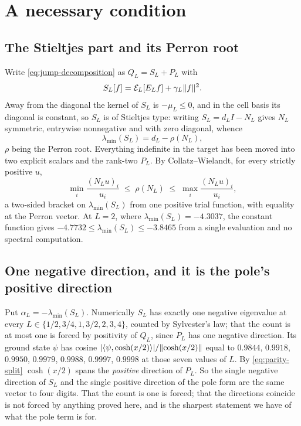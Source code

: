 \section{A necessary condition}\label{sec:necessary}
\subsection{The Stieltjes part and its Perron root}
Write \eqref{eq:jump-decomposition} as $Q_L=S_L+P_L$ with
\begin{equation}\label{eq:SL}
 S_L[f]=\mathcal E_L[E_Lf]+\gamma_L\lVert f\rVert^2 .
\end{equation}
Away from the diagonal the kernel of $S_L$ is $-\mu_L\leq0$, and in the cell
basis its diagonal is constant, so $S_L$ is of Stieltjes type: writing
$S_L=d_LI-N_L$ gives $N_L$ symmetric, entrywise nonnegative and with zero
diagonal, whence
\begin{equation}\label{eq:perron}
 \lambda_{\min}(S_L)=d_L-\rho(N_L),
\end{equation}
$\rho$ being the Perron root. Everything indefinite in the target has been moved
into two explicit scalars and the rank-two $P_L$. By Collatz--Wielandt, for
every strictly positive $u$,
\begin{equation}\label{eq:cw}
 \min_i\frac{(N_Lu)_i}{u_i}\;\leq\;\rho(N_L)\;\leq\;\max_i\frac{(N_Lu)_i}{u_i},
\end{equation}
a two-sided bracket on $\lambda_{\min}(S_L)$ from one positive trial function,
with equality at the Perron vector. At $L=2$, where
$\lambda_{\min}(S_L)=-4.3037$, the constant function gives
$-4.7732\leq\lambda_{\min}(S_L)\leq-3.8465$ from a single evaluation and no
spectral computation.

\subsection{One negative direction, and it is the pole's positive direction}
Put $\alpha_L=-\lambda_{\min}(S_L)$. Numerically $S_L$ has exactly one negative
eigenvalue at every $L\in\{1/2,3/4,1,3/2,2,3,4\}$, counted by Sylvester's law;
that the count is at most one is forced by positivity of $Q_L$, since
$P_L$ has one negative direction. Its ground state $\psi$ has cosine
$|\langle \psi,\cosh(x/2)\rangle|/\lVert \cosh(x/2)\rVert$ equal to
$0.9844$, $0.9918$, $0.9950$, $0.9979$, $0.9988$, $0.9997$, $0.9998$ at those
seven values of $L$. By \eqref{eq:parity-split} $\cosh(x/2)$ spans the
\emph{positive} direction of $P_L$. So the single negative direction of $S_L$
and the single positive direction of the pole form are the same vector to four
digits. That the count is one is forced; that the directions coincide is not
forced by anything proved here, and is the sharpest statement we have of what
the pole term is for.

